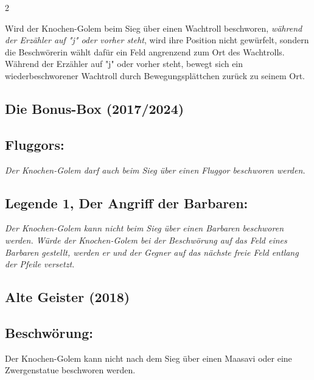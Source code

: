 \documentclass[10pt, a4paper, oneside]{book}
\newcommand{\fan}[1]{\textit{#1}}
\begin{document}
\begin{multicols*}{2}
\begin{bgcolor}
Wird der Knochen-Golem beim Sieg über einen Wachtroll beschworen, \fan{während der Erzähler auf "j" oder vorher steht}, wird ihre Position nicht gewürfelt, sondern die Beschwörerin wählt dafür ein Feld angrenzend zum Ort des Wachtrolls.  Während der Erzähler auf "j" oder vorher steht, bewegt sich ein wiederbeschworener Wachtroll durch Bewegungsplättchen zurück zu seinem Ort.
\supercite{DH:Begleitheft}


\end{bgcolor}




\begin{bgcolor}[color-BB]
\section{Die Bonus-Box (2017/2024)}


\subsection{Fluggors:}

\fan{Der Knochen-Golem darf auch beim Sieg über einen Fluggor beschworen werden.}



\subsection{Legende 1, Der Angriff der Barbaren:}

\fan{Der Knochen-Golem kann nicht beim Sieg über einen Barbaren beschworen werden. Würde der Knochen-Golem bei der Beschwörung auf das Feld eines Barbaren gestellt, werden er und der Gegner auf das nächste freie Feld entlang der Pfeile versetzt.}

\end{bgcolor}




\begin{bgcolor}[color-AG]
\section{Alte Geister (2018)}


\subsection{Beschwörung:}

Der Knochen-Golem kann nicht nach dem Sieg über einen Maasavi oder eine Zwergenstatue beschworen werden.
\supercite{AG:Begleitheft}


\end{bgcolor}
\end{multicols*}
\end{document}
